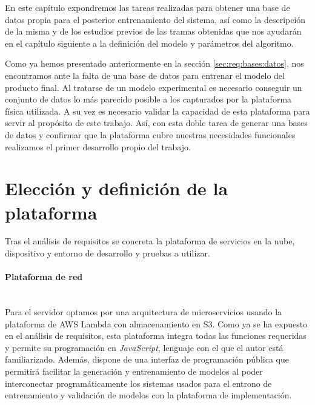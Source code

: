 
En este capítulo expondremos las tareas realizadas para obtener una base de datos propia para el posterior entrenamiento del sistema, así como la descripción de la misma y de los estudios previos de las tramas obtenidas que nos ayudarán en el capítulo siguiente a la definición del modelo y parámetros del algoritmo.

Como ya hemos presentado anteriormente en la sección \ref{sec:req:bases:datos}, nos encontramos ante la falta de una base de datos para entrenar el modelo del producto final. Al tratarse de un modelo experimental es necesario conseguir un conjunto de datos lo más parecido posible a los capturados por la plataforma física utilizada. A su vez es necesario validar la capacidad de esta plataforma para servir al propósito de este trabajo. Así, con esta doble tarea de generar una bases de datos y confirmar que la plataforma cubre nuestras necesidades funcionales realizamos el primer desarrollo propio del trabajo.

\section{Elección y definición de la plataforma}\label{sec:imp:plataforma}

Tras el análisis de requisitos se concreta la plataforma de servicios en la nube, dispositivo y entorno de desarrollo y pruebas a utilizar.

\paragraph{Plataforma de red}\\
Para el servidor optamos por una arquitectura de microservicios usando la plataforma de AWS Lambda con almacenamiento en S3. Como ya se ha expuesto en el análisis de requisitos, esta plataforma integra todas las funciones requeridas y permite su programación en \textit{JavaScript}, lenguaje con el que el autor está familiarizado. Además, dispone de una interfaz de programación pública que permitirá facilitar la generación y entrenamiento de modelos al poder interconectar programáticamente los sistemas usados para el entrono de entrenamiento y validación de modelos con la plataforma de implementación.

